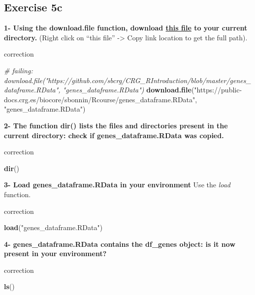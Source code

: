 \documentclass[]{book}
\newenvironment{Shaded}{\begin{snugshade}}{\end{snugshade}}
\newcommand{\CommentTok}[1]{\textcolor[rgb]{0.56,0.35,0.01}{\textit{#1}}}
\newcommand{\KeywordTok}[1]{\textcolor[rgb]{0.13,0.29,0.53}{\textbf{#1}}}
\newcommand{\NormalTok}[1]{#1}
\newcommand{\StringTok}[1]{\textcolor[rgb]{0.31,0.60,0.02}{#1}}
\begin{document}
\hypertarget{exercise-5c}{%
\subsection{Exercise 5c}\label{exercise-5c}}

\textbf{1- Using the download.file function, download \href{https://public-docs.crg.es/biocore/sbonnin/Rcourse/genes_dataframe.RData}{this file} to your current directory.} (Right click on ``this file'' -\textgreater{} Copy link location to get the full path).

correction

\begin{Shaded}
\begin{Highlighting}[]
\CommentTok{# failing: download.file("https://github.com/sbcrg/CRG_RIntroduction/blob/master/genes_dataframe.RData", "genes_dataframe.RData")}
\KeywordTok{download.file}\NormalTok{(}\StringTok{"https://public-docs.crg.es/biocore/sbonnin/Rcourse/genes_dataframe.RData"}\NormalTok{, }\StringTok{"genes_dataframe.RData"}\NormalTok{)}
\end{Highlighting}
\end{Shaded}

\textbf{2- The function dir() lists the files and directories present in the current directory: check if genes\_dataframe.RData was copied.}

correction

\begin{Shaded}
\begin{Highlighting}[]
\KeywordTok{dir}\NormalTok{()}
\end{Highlighting}
\end{Shaded}

\textbf{3- Load genes\_dataframe.RData in your environment}
Use the \emph{load} function.

correction

\begin{Shaded}
\begin{Highlighting}[]
\KeywordTok{load}\NormalTok{(}\StringTok{"genes_dataframe.RData"}\NormalTok{)}
\end{Highlighting}
\end{Shaded}

\textbf{4- genes\_dataframe.RData contains the df\_genes object: is it now present in your environment?}

correction

\begin{Shaded}
\begin{Highlighting}[]
\KeywordTok{ls}\NormalTok{()}
\end{Highlighting}
\end{Shaded}
\end{document}
